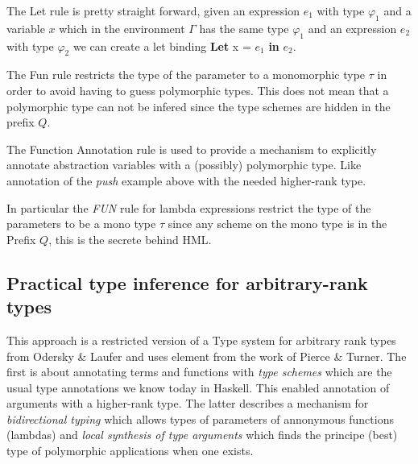 \documentclass[12pt, a4paper, oneside]{article}
\begin{document}
The Let rule is pretty straight forward, given an expression $e_1$ with type $\varphi_1$ and a variable $x$ which in the environment $\Gamma$ has the same type $\varphi_1$ and an expression $e_2$ with type $\varphi_2$ we can create a let binding \textbf{Let} x = $e_1$ \textbf{in} $e_2$.

\begin{prooftree}
\end{prooftree}

The Fun rule restricts the type of the parameter to a monomorphic type $\tau$ in order to avoid having to guess polymorphic types. This does not mean that a polymorphic type can not be infered since the type schemes are hidden in the prefix $Q$.

\begin{prooftree}
\end{prooftree}

The Function Annotation rule is used to provide a mechanism to explicitly annotate abstraction variables with a (possibly) polymorphic type. Like annotation of the \textit{push} example above with the needed higher-rank type.

In particular the \textit{FUN} rule for lambda expressions restrict the type of the parameters to be a mono type $\tau$ since any scheme on the mono type is in the Prefix $Q$, this is the secrete behind HML.
 
\subsection{Practical type inference for arbitrary-rank types\cite{boring}}
This approach is a restricted version of a Type system for arbitrary rank types from Odersky \& Laufer\cite{odesky} and uses element from the work of Pierce \& Turner\cite{pierce}. The first is about annotating terms and functions with \textit{type schemes} which are the usual type annotations we know today in Haskell. This enabled annotation of arguments with a higher-rank type. The latter describes a mechanism for \textit{bidirectional typing} which allows types of parameters of annonymous functions (lambdas) and \textit{local synthesis of type arguments} which finds the principe (best) type of polymorphic applications when one exists.
\end{document}
